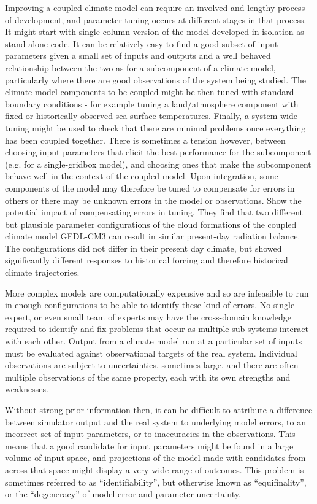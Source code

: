 \documentclass[gmd, manuscript]{copernicus}
\begin{document}
Improving a coupled climate model can require an involved and lengthy process of development, and parameter tuning occurs at different stages in that process. It might start with single column version of the model developed in isolation as stand-alone code. It can be relatively easy to find a good subset of input parameters given a small set of inputs and outputs and a well behaved relationship between the two as for a subcomponent of a climate model, particularly where there are good observations of the system being studied. The climate model components to be coupled might be then tuned with standard boundary conditions - for example tuning a land/atmosphere component with fixed or historically observed sea surface temperatures. Finally, a system-wide tuning might be used to check that there are minimal  problems once everything has been coupled together.  There is sometimes a tension however, between choosing input parameters that elicit the best performance for the subcomponent (e.g. for a single-gridbox model), and choosing ones that make the subcomponent behave well in the context of the coupled model.  Upon integration, some components of the model may therefore be tuned to compensate for errors in others or there may be unknown errors in the model or observations.  \cite{golaz2013cloud} Show the potential impact of compensating errors in tuning. They find that two different but plausible parameter configurations of the cloud formations of the coupled climate model GFDL-CM3 can result in similar present-day radiation balance. The configurations did not differ in their present day climate, but showed significantly different responses to historical forcing and therefore historical climate trajectories.

More complex models are computationally expensive and so are infeasible to run in enough configurations to be able to identify these kind of errors. No single expert, or even small team of experts may have the cross-domain knowledge required to identify and fix problems that occur as multiple sub systems interact with each other. Output from a climate model run at a particular set of inputs must be evaluated against observational targets of the real system. Individual observations are subject to uncertainties, sometimes large, and there are often multiple observations of the same property, each with its own strengths and weaknesses.

Without strong prior information then, it can be difficult to attribute a difference between simulator output and the real system to underlying model errors, to an incorrect set of input parameters, or to inaccuracies in the observations. This means that a good candidate for input parameters might be found in a large volume of input space, and projections of the model made with candidates from across that space might display a very wide range of outcomes. This problem is sometimes referred to as ``identifiability'', but otherwise known as ``equifinality'', or the ``degeneracy'' of model error and parameter uncertainty. 
\end{document}
